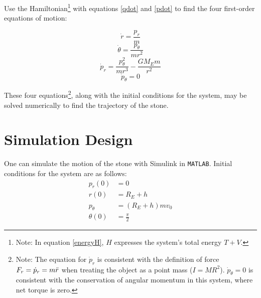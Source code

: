 \documentclass[aps,twocolumn]{revtex4-1}
\begin{document}
Use the Hamiltonian\footnote{Note: In equation \ref{energyH}, $H$ expresses the system's total energy $T + V$.} with equations \ref{qdot} and \ref{pdot} to find the four first-order equations of motion:

\begin{equation}
    \dot r = \frac{p_r}{m} 
\end{equation}
\begin{equation}
    \dot \theta = \frac{p_\theta}{mr^2} 
\end{equation}
\begin{equation}
    \dot p_r = \frac{p_\theta^2}{mr^3} - \frac{GM_Em}{r^2}
\end{equation} 
\begin{equation}
    \dot p_\theta  = 0
\end{equation}

These four equations\footnote{Note: The equation for $\dot p_r$ is consistent with the definition of force $F_r=\dot p_r = m\Ddot{r}$ when treating the object as a point mass ($I=MR^2$). $\dot p_\theta = 0$ is consistent with the conservation of angular momentum in this system, where net torque is zero.}, along with the initial conditions for the system, may be solved numerically to find the trajectory of the stone. 

\section{Simulation Design}
One can simulate the motion of the stone with Simulink in \verb|MATLAB|. Initial conditions for the system are as follows:
\begin{align*}
    p_r(0) &= 0\\
    r(0) &= R_E+h\\
    p_\theta &= (R_E+h)mv_0\\
    \theta(0)&=\frac{\pi}{2}
\end{align*}
\end{document}
